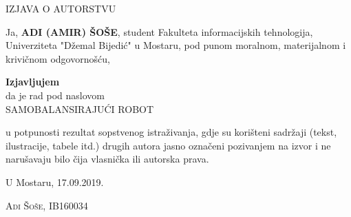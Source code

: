 \documentclass[../Document.tex]{subfiles}
\begin{document}
\begin{center}
	{\LARGE IZJAVA O AUTORSTVU}\\
\end{center}

\vspace{0.7cm}
Ja, \textbf{ADI (AMIR) ŠOŠE}, student Fakulteta informacijskih tehnologija, Univerziteta "Džemal Bijedić" u Mostaru, pod punom moralnom, materijalnom i krivičnom odgovornošću,\par

\begin{center}
	{\bfseries Izjavljujem}\\[5pt]
	da je rad pod naslovom\\[10pt]
	{\large SAMOBALANSIRAJUĆI ROBOT}\\
\end{center}

\noindent
u potpunosti rezultat sopstvenog istraživanja, gdje su korišteni sadržaji (tekst, ilustracije, tabele itd.) drugih autora jasno označeni pozivanjem na izvor i ne narušavaju bilo čija vlasnička ili autorska prava.\par

\vspace{2cm}
U Mostaru, 17.09.2019.
\hfill
\hrulefill
\par
\hfill
{\scshape Adi Šoše, IB160034}
\end{document}
